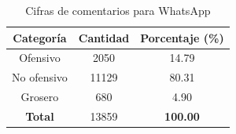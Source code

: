 \begin{table}[!ht]
	\centering
	\begin{tabular}{|c|c|c|}
		\hline
		\textbf{Categoría} & \textbf{Cantidad} & \textbf{Porcentaje (\%)} \\ \hline
		Ofensivo & 2050 & 14.79 \\ 
		No ofensivo & 11129 & 80.31 \\ 
		Grosero & 680 & 4.90 \\ \hline
		\textbf{Total} & 13859 & \textbf{100.00} \\ \hline
	\end{tabular}
	\caption{Cifras de comentarios para WhatsApp}
	\label{tbl:whatsapp}
\end{table}


